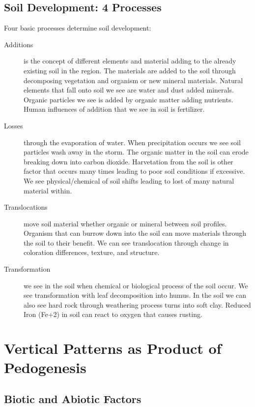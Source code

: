 \subsection{Soil Development: 4 Processes}

Four basic processes determine soil development: 

\begin{description}
	\item[Additions] is the concept of different elements and material adding to the already existing soil in the region. The materials are added to the soil through decomposing vegetation and organism or new mineral materials.  Natural elements that fall onto soil we see are water and dust added minerals. Organic particles we see is added by organic matter adding nutrients. Human influences of addition that we see in soil is fertilizer. 

\item[Losses] through the evaporation of water. When precipitation occurs we see soil particles wash away in the storm. The organic matter in the soil can erode breaking down into carbon dioxide.  Harvetation from the soil is other factor that occurs many times leading to poor soil conditions if excessive. We see physical/chemical of soil shifts leading to lost of many natural material within. 

\item[Translocations] move soil material whether organic or mineral between soil profiles. Organism that can burrow down into the soil can move materials through the soil to their benefit. We can see translocation through change in coloration differences, texture, and structure.

\item[Transformation] we see in the soil when chemical or biological process of the soil occur. We see transformation with leaf decomposition into humus. In the soil we can also see hard rock through weathering process turns into soft clay. Reduced Iron (Fe+2) in soil can react to oxygen that causes rusting.

\end{description}

\section[Pedogenesis]{Vertical Patterns as Product of Pedogenesis}

\subsection{Biotic and Abiotic Factors}

